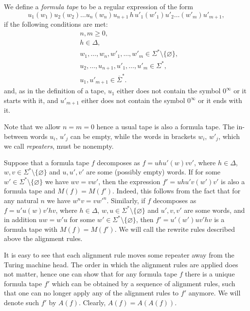 \documentclass{article}
\begin{document}
We define a \emph{formula tape} to be a regular expression of the form
\[ u_1 (w_1) u_2 (w_2) \dots u_n (w_n) u_{n+1}\, h\, u'_1 (w'_1) u'_2 \dots (w'_m) u'_{m+1}, \]
if the following conditions are met:
\begin{align*}
	& n, m \geq 0,\\
	& h \in \Delta,\\
	& w_1, \dots, w_n, w'_1, \dots, w'_m \in \Sigma^* \setminus \{ \varnothing \},\\
	& u_2, \dots, u_{n+1}, u'_1, \dots, u'_m \in \Sigma^*,\\
	& u_1, u'_{m+1} \in \overline{\Sigma}^*.
\end{align*}
and, as in the definition of a tape, \( u_1 \) either does not contain the symbol \( 0^\infty \) or it starts with it, and \( u'_{m+1} \) either does not
contain the symbol \( 0^\infty \) or it ends with it.

Note that we allow \( n = m = 0 \) hence a usual tape is also a formula tape. The in-between words \( u_i,\, u'_j \) can be empty,
while the words in brackets \( w_i,\, w'_j \), which we call \emph{repeaters}, must be nonempty.

Suppose that a formula tape \( f \) decomposes as \( f = u h u' (w) v v' \), where \( h \in \Delta \), \( w, v \in \Sigma^* \setminus \{ \varnothing \} \)
and \( u, u', v' \) are some (possibly empty) words. If for some \( w' \in \Sigma^* \setminus \{ \varnothing \} \) we have \( wv = vw' \), then the expression \( f' = u h u' v (w') v' \)
is also a formula tape and \( M(f) = M(f') \). Indeed, this follows from the fact that for any natural \( n \) we have \( w^n v = v w'^n \).
Similarly, if \( f \) decomposes as \( f = u' u (w) v' h v \), where \( h \in \Delta \), \( w, u \in \Sigma^* \setminus \{ \varnothing \} \)
and \( u', v, v' \) are some words, and in addition \( uw = w'u \) for some \( w' \in \Sigma^* \setminus \{ \varnothing \} \), then \( f' = u' (w') u v' h v \)
is a formula tape with \( M(f) = M(f') \). We will call the rewrite rules described above the alignment rules.

It is easy to see that each alignment rule moves some repeater away from the Turing machine head. The order in which the alignment rules
are applied does not matter, hence one can show that for any formula tape \( f \) there is a unique formula tape \( f' \) which can be obtained by a sequence of alignment rules,
such that one can no longer apply any of the alignment rules to \( f' \) anymore. We will denote such \( f' \) by \( A(f) \). Clearly, \( A(f) = A(A(f)) \).
\medskip
\end{document}
